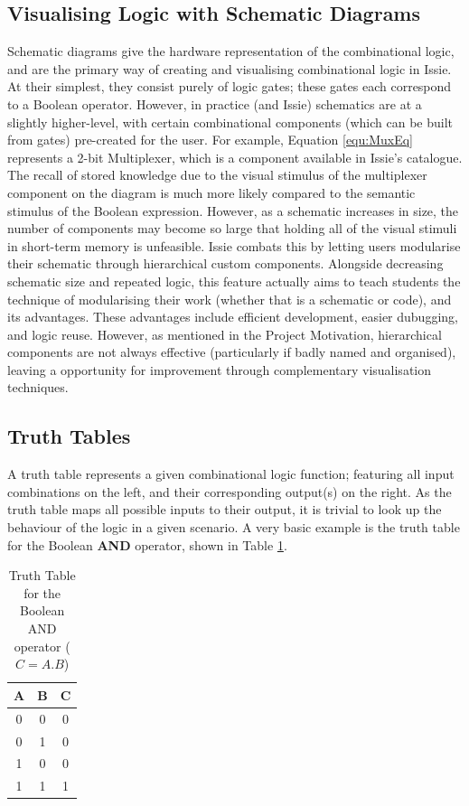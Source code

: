 \subsection{Visualising Logic with Schematic Diagrams}
Schematic diagrams give the hardware representation of the combinational logic, and are the primary way of creating and visualising combinational logic in Issie. At their simplest, they consist purely of logic gates; these gates each correspond to a Boolean operator. However, in practice (and Issie) schematics are at a slightly higher-level, with certain combinational components (which can be built from gates) pre-created for the user. For example, Equation \ref{equ:MuxEq} represents a 2-bit Multiplexer, which is a component available in Issie's catalogue. The recall of stored knowledge due to the visual stimulus of the multiplexer component on the diagram is much more likely compared to the semantic stimulus of the Boolean expression. However, as a schematic increases in size, the number of components may become so large that holding all of the visual stimuli in short-term memory is unfeasible. Issie combats this by letting users modularise their schematic through hierarchical custom components. Alongside decreasing schematic size and repeated logic, this feature actually aims to teach students the technique of modularising their work (whether that is a schematic or code), and its advantages. These advantages \cite{arm_modular} include efficient development, easier dubugging, and logic reuse. However, as mentioned in the Project Motivation, hierarchical components are not always effective (particularly if badly named and organised), leaving a opportunity for improvement through complementary visualisation techniques. 

\subsection{Truth Tables} \label{subsec:TruthTables}
A truth table represents a given combinational logic function; featuring all input combinations on the left, and their corresponding output(s) on the right. As the truth table maps all possible inputs to their output, it is trivial to look up the behaviour of the logic in a given scenario. A very basic example is the truth table for the Boolean \textbf{AND} operator, shown in Table \ref{tab:And_TT}.

\begin{table}[h!]
    \centering
    \begin{tabular}{c|c||c}
     \textbf{A} & \textbf{B} & \textbf{C} \\
     \hline
     0 & 0 & 0  \\
     0 & 1 & 0  \\
     1 & 0 & 0  \\
     1 & 1 & 1
    \end{tabular}
    \caption{Truth Table for the Boolean AND operator ($C = A.B$)}
    \label{tab:And_TT}
\end{table}

